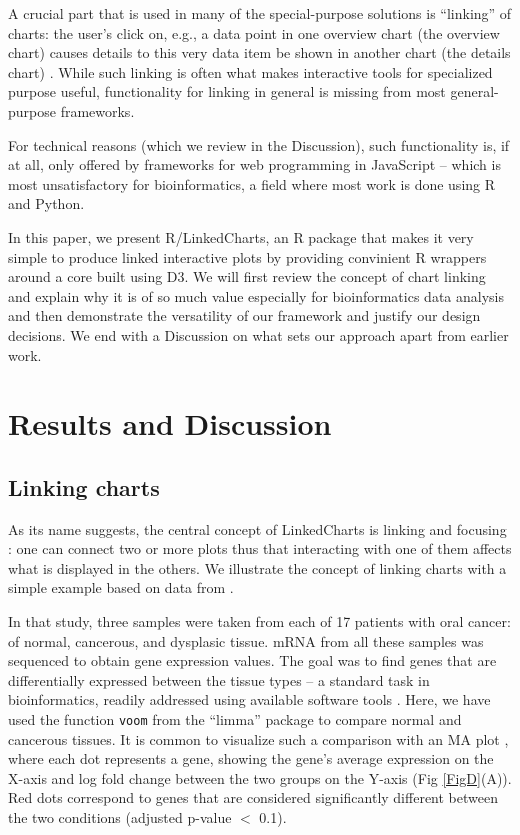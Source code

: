 \documentclass[twocolumn,10pt]{article}
\begin{document}
A crucial part that is used in many of the special-purpose solutions is ``linking'' of charts: the user's click on, e.g., a data point in one overview chart (the overview chart) causes details to this very data item be shown in another chart (the details chart) \citep{buja_1991}. While such linking is often what makes interactive tools for specialized purpose useful, functionality for linking in general is missing from most general-purpose frameworks. 

For technical reasons (which we review in the Discussion), such functionality is, if at all, only offered by frameworks for web programming in JavaScript -- which is most unsatisfactory for bioinformatics, a field where most work is done using R and Python.

In this paper, we present R/LinkedCharts, an R package that makes it very simple to produce linked interactive plots by providing convinient R wrappers around a core built using D3. We will first review the concept of chart linking and explain why it is of so much value especially for bioinformatics data analysis and then demonstrate the versatility of our framework and justify our design decisions. We end with a Discussion on what sets our approach apart from earlier work.


\section{Results and Discussion}

\subsection{Linking charts}

As its name suggests, the central concept of LinkedCharts is linking and focusing \citep{buja_1991}: one can connect two or more plots thus that interacting with one of them affects what is displayed in the others. We illustrate the concept of linking charts with a simple example based on data from \citet{conway_2015}.

In that study, three samples were taken from each of 17 patients with oral cancer: of normal, cancerous, and dysplasic tissue. mRNA from all these samples was sequenced to obtain gene expression values. The goal was to find genes that are differentially expressed between the tissue types -- a standard task in bioinformatics, readily addressed using available software tools \citep{ritchie_2015, love_2014}. Here, we have used the function \texttt{voom} from the ``limma'' package \citep{law_2014} to compare normal and cancerous tissues. It is common to visualize such a comparison with an MA plot \citep{dudoit_2002}, where each dot represents a gene, showing the gene's average expression on the X-axis and log fold change between the two groups on the Y-axis (Fig \ref{FigD}(A)). Red dots correspond to genes that are considered significantly different between the two conditions (adjusted p-value $<$ 0.1). 
\end{document}
